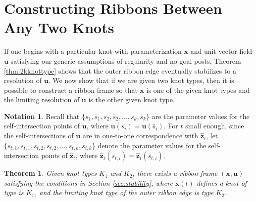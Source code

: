\documentclass[12pt]{article}
\numberwithin{equation}{subsection}
\newtheorem{thm}{Theorem}
\theoremstyle{definition}
\newtheorem*{no}{Notation}
\numberwithin{lem}{section}
\def\uu{\mathbf{u}}
\def\zhat{\mathbf{\hat{z}}}
\begin{document}

\section{Constructing Ribbons Between Any Two Knots}
\label{sec:constructrib}

If one begins with a particular knot with parameterization $\mathbf{x}$ and unit vector field $\mathbf{u}$ satisfying our generic assumptions of regularity and no goal posts, Theorem \ref{thm:2kknottype} shows that the outer ribbon edge eventually stabilizes to a resolution of $\mathbf{u}$.  We now show that if we are given two knot types, then it is possible to construct a ribbon frame so that $\mathbf{x}$ is one of the given knot types and the limiting resolution of $\mathbf{u}$ is the other given knot type.


\begin{no}
Recall that $\{s_1, \bar{s}_1, s_2, \bar{s}_2, \ldots, s_k, \bar{s}_k\}$ are the parameter values for the self-intersection points of $\uu$, where $\uu(s_i) = \uu(\bar{s}_i)$.  For $t$ small enough, since the self-intersections of $\uu$ are in one-to-one correspondence with $\zhat_t$, let $\{s_{t,1}, \bar{s}_{t,1}, s_{t,2}, \bar{s}_{t,2}, \ldots, s_{t,k}, \bar{s}_{t,k}\}$ denote the parameter values for the self-intersection points of $\zhat_t$, where $\zhat_t(s_{t,i}) = \zhat_t(\bar{s}_{t,i})$.
\end{no}

\begin{thm}
Given knot types $K_1$ and $K_2$, there exists a ribbon frame $(\mathbf{x},\mathbf{u})$ satisfying the conditions in Section \ref{sec:stability}, where $\mathbf{x}(t)$ defines a knot of type is $K_1$, and the limiting knot type of the outer ribbon edge is type $K_2$.
\label{thm:constructribbon}
\end{thm}
\end{document}
